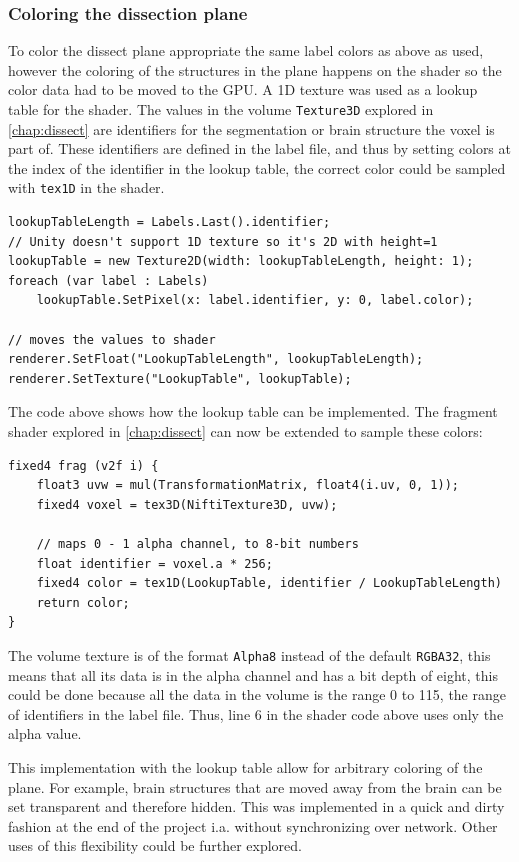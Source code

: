 \subsubsection*{Coloring the dissection plane}
To color the dissect plane appropriate the same label colors as above as used, however the coloring of the structures in the plane happens on the shader so the color data had to be moved to the GPU. A 1D texture was used as a lookup table for the shader. The values in the volume \texttt{Texture3D} explored in \autoref{chap:dissect} are identifiers for the segmentation or brain structure the voxel is part of. These identifiers are defined in the label file, and thus by setting colors at the index of the identifier in the lookup table, the correct color could be sampled with \texttt{tex1D} in the shader.

\begin{lstlisting}
lookupTableLength = Labels.Last().identifier;
// Unity doesn't support 1D texture so it's 2D with height=1 
lookupTable = new Texture2D(width: lookupTableLength, height: 1);
foreach (var label : Labels)
    lookupTable.SetPixel(x: label.identifier, y: 0, label.color);

// moves the values to shader
renderer.SetFloat("LookupTableLength", lookupTableLength);
renderer.SetTexture("LookupTable", lookupTable);
\end{lstlisting}

The code above shows how the lookup table can be implemented. The fragment shader explored in \autoref{chap:dissect} can now be extended to sample these colors:
\begin{lstlisting}
fixed4 frag (v2f i) {
    float3 uvw = mul(TransformationMatrix, float4(i.uv, 0, 1));
    fixed4 voxel = tex3D(NiftiTexture3D, uvw);

    // maps 0 - 1 alpha channel, to 8-bit numbers
    float identifier = voxel.a * 256; 
    fixed4 color = tex1D(LookupTable, identifier / LookupTableLength)
    return color;
}
\end{lstlisting}

The volume texture is of the format \texttt{Alpha8} instead of the default \texttt{RGBA32}, this means that all its data is in the alpha channel and has a bit depth of eight, this could be done because all the data in the volume is the range 0 to 115, the range of identifiers in the label file. Thus, line 6 in the shader code above uses only the alpha value. 

This implementation with the lookup table allow for arbitrary coloring of the plane. For example, brain structures that are moved away from the brain can be set transparent and therefore hidden. This was implemented in a quick and dirty fashion at the end of the project i.a. without synchronizing over network. Other uses of this flexibility could be further explored. 

